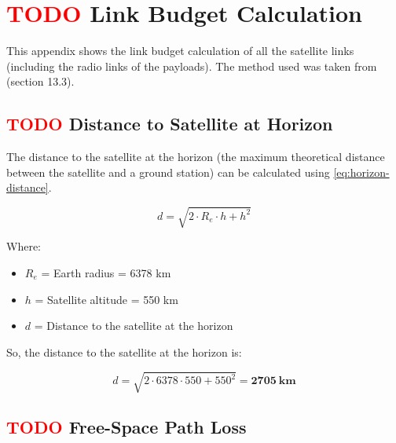 %
%
%
%
%

%
%
%
%
%
%

\chapter{ \textcolor{red}{TODO} Link Budget Calculation} \label{anx:link-budget}

This appendix shows the link budget calculation of all the satellite links (including the radio links of the payloads). The method used was taken from \cite{larson2005} (section 13.3).

\section{ \textcolor{red}{TODO} Distance to Satellite at Horizon}

The distance to the satellite at the horizon (the maximum theoretical distance between the satellite and a ground station) can be calculated using \autoref{eq:horizon-distance}.

\begin{equation} \label{eq:horizon-distance}
d = \sqrt{2\cdot R_{e}\cdot h + h^{2}}
\end{equation}

Where:

\begin{itemize}
    \item $R_{e}$ = Earth radius = 6378 km
    \item $h$ = Satellite altitude = 550 km
    \item $d$ = Distance to the satellite at the horizon
\end{itemize}

So, the distance to the satellite at the horizon is:

\begin{equation} \label{eq:horizon-distance-result}
d = \sqrt{2\cdot 6378\cdot 550 + 550^{2}} = \mathbf{2705\ km}
\end{equation}

\section{ \textcolor{red}{TODO} Free-Space Path Loss}

